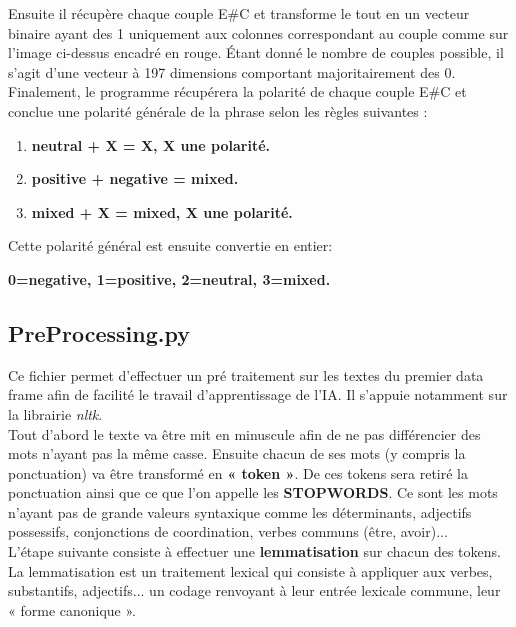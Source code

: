 \documentclass[12pt ,a4paper ]{article}
\begin{document}
\begin{multicols}{2}
\noindent Ensuite il récupère chaque couple E\#C et transforme le tout en un vecteur binaire ayant des 1 uniquement aux colonnes correspondant au couple comme sur l'image ci-dessus encadré en rouge. Étant donné le nombre de couples possible, il s'agit d'une vecteur à 197 dimensions comportant majoritairement des 0.\\

\noindent Finalement, le programme récupérera la polarité de chaque couple E\#C et conclue une polarité générale de la phrase selon les règles suivantes :
\begin{enumerate}
\item \textbf{\small{neutral + X = X, X une polarité. }}
\item \textbf{\small{positive + negative = mixed.}}
\item \textbf{\small{mixed + X = mixed, X une polarité.}}
\end{enumerate}

\noindent Cette polarité général est ensuite convertie en entier:

\noindent \textbf{0=negative, 1=positive, 2=neutral, 3=mixed.}

\subsection{PreProcessing.py}
Ce fichier permet d'effectuer un pré traitement sur les textes du premier data frame afin de facilité le travail d'apprentissage de l'IA. Il s'appuie notamment sur la librairie \textit{nltk}.\\

\noindent Tout d'abord le texte va être mit en minuscule afin de ne pas différencier des mots n'ayant pas la même casse. Ensuite chacun de ses mots (y compris la ponctuation) va être transformé en \textbf{« token »}. De ces tokens sera retiré la ponctuation ainsi que ce que l'on appelle les \textbf{STOPWORDS}. Ce sont les mots n'ayant pas de grande valeurs syntaxique comme les déterminants, adjectifs possessifs, conjonctions de coordination, verbes communs (être, avoir)...\\

\noindent L'étape suivante consiste à effectuer une \textbf{lemmatisation} sur chacun des tokens. La lemmatisation est un traitement lexical qui consiste à appliquer aux verbes, substantifs, adjectifs... un codage renvoyant à leur entrée lexicale commune, leur « forme canonique ».\\\\


\end{multicols}
\end{document}
